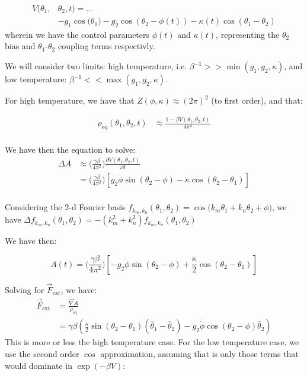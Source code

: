 \documentclass[%
 reprint,
 amsmath,amssymb,
 aps,
]{revtex4-2}
\begin{document}
\begin{align*}
  V(\theta_{1}, &\theta_{2}, t) = ... \\
  & -g_1 \cos\big(\theta_1) - g_2 \cos(\theta_2 - \phi(t)) - \kappa(t) \cos(\theta_1 - \theta_2)
\end{align*}
\noindent
wherein we have the control parameters $\phi(t)$ and $\kappa(t)$, representing  the $\theta_2$ bias and $\theta_1$-$\theta_2$ coupling terms respectivly.

We will consider two limits: high temperature, i.e. $\beta^{-1} >> \min (g_1, g_2, \kappa)$, and low temperature: $\beta^{-1} << \max (g_1, g_2, \kappa)$.

For high temperature, we have that $Z(\phi, \kappa) \approx (2 \pi)^2$ (to first order), and that:

\begin{align*}
    \rho_{\mathrm{eq}}(\theta_1, \theta_2, t) &\approx \frac{1 - \beta V(\theta_1, \theta_2, t)}{4 \pi^2} \\
\end{align*}

We have then the equation to solve:
\begin{align*}
  \Delta A &\approx \bigg(\frac{\gamma \beta}{4\pi^2}\bigg) \frac{\partial V(\theta_1, \theta_2, t)}{\partial t} \\
  &= \bigg(\frac{\gamma \beta}{4\pi^2}\bigg) [ g_2 \dot{\phi} \sin(\theta_2 - \phi) - \dot{\kappa} \cos(\theta_2 - \theta_1) ] \\
\end{align*}

Considering the 2-d Fourier basis ${f_{k_m,k_n}(\theta_1, \theta_2) = \cos(k_m \theta_1 + k_n \theta_2 + \phi})$, we have $\Delta f_{k_m,k_n}(\theta_1, \theta_2) = -(k_m^2 + k_n^2)f_{k_m,k_n}(\theta_1, \theta_2)$

We have then:

\begin{equation}
  A(t) = \bigg(\frac{\gamma \beta}{4\pi^2}\bigg) [ -g_2 \dot{\phi} \sin(\theta_2 - \phi) + \frac{\dot{\kappa}}{2} \cos(\theta_2 - \theta_1) ]
\end{equation}

Solving for $\vec{F}_\mathrm{ext}$, we have:
\begin{align*}
  \vec{F}_{\mathrm{ext}} &= \frac{\vec{\nabla} A}{\rho_{\mathrm{eq}}} \\
  &= \gamma \beta (\frac{\dot{\kappa}}{2} \sin(\theta_2 - \theta_1) (\hat{\theta}_1 - \hat{\theta}_2 ) - g_2\dot{\phi}\cos(\theta_2 - \phi) \hat{\theta}_2)
\end{align*}
\noindent
This is more or less the high temperature case. For the low temperature case, we use the second order $\cos$ approximation, assuming that is only those terms that would dominate in $\exp (-\beta V)$:
\end{document}
